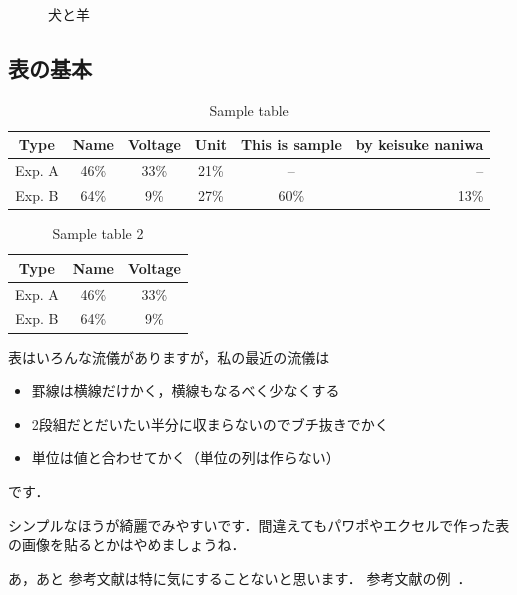 \documentclass[platex,dvipdfmx]{jlreq}%
\numberwithin{equation}{section}%
\begin{document}
\begin{figure}[tb]
\begin{minipage}[b]{.5\columnwidth}
  \label{fig:gorilla}
 \end{minipage}
 \caption{犬と羊}\label{fig:animals}
\end{figure}

\subsection{表の基本}

\begin{table}[tb]
  \caption{Sample table}
   \label{table:test}
   \centering
   \begin{tabular}{cccccr}\hline
    Type & Name & Voltage & Unit & This is sample & by keisuke naniwa\\ \hline \hline
   Exp. A & 46\%& 33\%& 21\%& --& --\\ 
   Exp. B & 64\%& 9\%& 27\%& 60\%& 13\%\\ \hline    
   \end{tabular}
\end{table}
\fi%

\begin{table}[tb]
  \caption{Sample table 2}
   \label{table:test2}
   \centering
   \begin{tabular}{ccc}\hline
    Type & Name & Voltage \\ \hline \hline
   Exp. A & 46\%& 33\% \\ 
   Exp. B & 64\%& 9\% \\ \hline    
   \end{tabular}
\end{table}

表はいろんな流儀がありますが，私の最近の流儀は
\begin{itemize}
 \item 罫線は横線だけかく，横線もなるべく少なくする
 \item 2段組だとだいたい半分に収まらないのでブチ抜きでかく
 \item 単位は値と合わせてかく（単位の列は作らない）
\end{itemize}
です．

シンプルなほうが綺麗でみやすいです．間違えてもパワポやエクセルで作った表の画像を貼るとかはやめましょうね．

あ，あと
参考文献は特に気にすることないと思います．
参考文献の例~\cite{mike,bibtest}．
\end{document}
